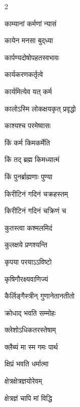 \begin{multicols}{2}
\begin{indexlist}
\item काम्यानां कर्मणां न्यासं \dotfill {}
\item कायेन मनसा बुद्‌ध्या \dotfill {}
\item कार्पण्यदोषोपहतस्वभावः \dotfill {}
\item कार्यकरणकर्तृत्वे \dotfill {}
\item कार्यमित्येव यत् कर्म \dotfill {}
\item कालोऽस्मि लोकक्षयकृत् प्रवृद्धो \dotfill {}
\item काश्यश्च परमेष्वासः \dotfill {}
\item किं कर्म किमकर्मेति \dotfill {}
\item किं तद् ब्रह्म किमध्यात्मं \dotfill {}
\item किं पुनर्ब्राह्मणाः पुण्या \dotfill {}
\item किरीटिनं गदिनं चक्रहस्तम् \dotfill {}
\item किरीटिनं गदिनं चक्रिणं च \dotfill {}
\item कुतस्त्वा कश्मलमिदं \dotfill {}
\item कुलक्षये प्रणश्यन्ति \dotfill {}
\item कृपया परयाऽऽविष्टो \dotfill {}
\item कृषिगौरक्ष्यवाणिज्यं \dotfill {}
\item कैर्लिङ्गैस्त्रीन् गुणानेतानतीतो \dotfill {}
\item क्रोधाद् भवति सम्मोहः \dotfill {}
\item क्लेशोऽधिकतरस्तेषाम् \dotfill {}
\item क्लैब्यं मा स्म गमः पार्थ \dotfill {}
\item क्षिप्रं भवति धर्मात्मा \dotfill {}
\item क्षेत्रक्षेत्रज्ञयोरेवम् \dotfill {}
\item क्षेत्रज्ञं चापि मां विद्धि \dotfill {}
\end{indexlist}


\end{multicols}
